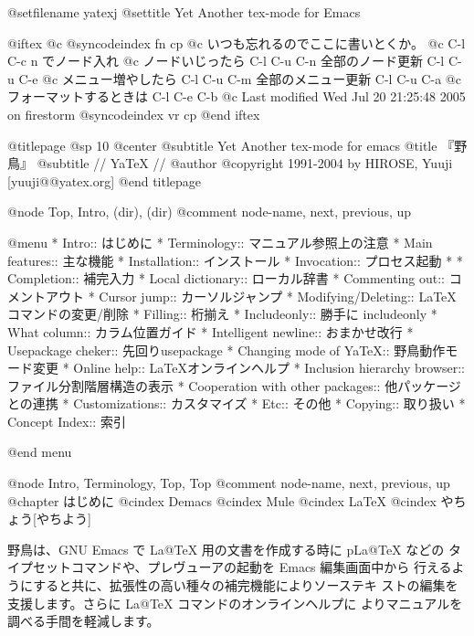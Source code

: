 \def\lang{jp} %

@setfilename yatexj
@settitle Yet Another tex-mode for Emacs

@iftex
@c @syncodeindex fn cp
@c いつも忘れるのでここに書いとくか。
@c C-l C-c n でノード入れ
@c ノードいじったら C-l C-u C-n 全部のノード更新 C-l C-u C-e
@c メニュー増やしたら C-l C-u C-m 全部のメニュー更新 C-l C-u C-a
@c フォーマットするときは C-l C-e C-b
@c Last modified Wed Jul 20 21:25:48 2005 on firestorm
@syncodeindex vr cp
@end iftex

@titlepage
@sp 10
@center
@subtitle Yet Another tex-mode for emacs
@title 『野鳥』
@subtitle // YaTeX //
@author @copyright{} 1991-2004 by    HIROSE, Yuuji [yuuji@@yatex.org]
@end titlepage

@node Top, Intro, (dir), (dir)
@comment  node-name,  next,  previous,  up

@menu
* Intro::                       はじめに
* Terminology::                 マニュアル参照上の注意
* Main features::               主な機能
* Installation::                インストール
* Invocation::                  プロセス起動
* %
* Completion::                  補完入力
* Local dictionary::            ローカル辞書
* Commenting out::              コメントアウト
* Cursor jump::                 カーソルジャンプ
* Modifying/Deleting::          LaTeXコマンドの変更/削除
* Filling::                     桁揃え
* Includeonly::                 勝手に includeonly
* What column::                 カラム位置ガイド
* Intelligent newline::         おまかせ改行
* Usepackage cheker::           先回りusepackage
* Changing mode of YaTeX::      野鳥動作モード変更
* Online help::                 LaTeXオンラインヘルプ
* Inclusion hierarchy browser::  ファイル分割階層構造の表示
* Cooperation with other packages::  他パッケージとの連携
* Customizations::              カスタマイズ
* Etc::                         その他
* Copying::                     取り扱い
* Concept Index::               索引

@end menu

@node Intro, Terminology, Top, Top
@comment  node-name,  next,  previous,  up
@chapter はじめに
@cindex Demacs
@cindex Mule
@cindex LaTeX
@cindex やちょう[やちよう]

  野鳥は、GNU Emacs で La@TeX{} 用の文書を作成する時に pLa@TeX{} などの
タイプセットコマンドや、プレヴューアの起動を Emacs 編集画面中から
行えるようにすると共に、拡張性の高い種々の補完機能によりソーステキ
ストの編集を支援します。さらに La@TeX{} コマンドのオンラインヘルプに
よりマニュアルを調べる手間を軽減します。

